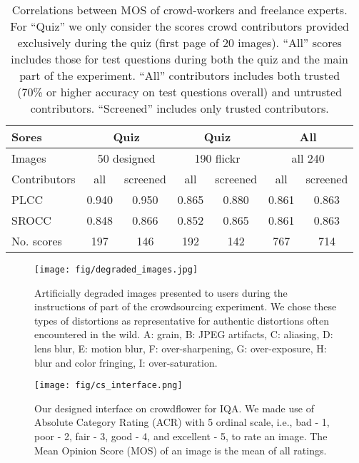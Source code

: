 \documentclass{article}
\begin{document}
\begin{table*}[!ht]
\centering
\caption{Correlations between MOS of crowd-workers and freelance experts. For ``Quiz'' we only consider the scores crowd contributors provided exclusively during the quiz (first page of 20 images). ``All'' scores includes  those for test questions during both the quiz and the main part of the experiment. ``All'' contributors includes both trusted (70\% or higher accuracy on test questions overall) and untrusted contributors. ``Screened'' includes only trusted contributors.}
\vspace{10pt}
\begin{tabular}{l |c c |c c| c c} \hline
Sores & \multicolumn{2}{c|}{Quiz}& 
	\multicolumn{2}{c|}{Quiz} & 
    \multicolumn{2}{c}{All}\\ \hline
Images & \multicolumn{2}{c|}{50 designed}& 
	\multicolumn{2}{c|}{190 flickr} & 
    \multicolumn{2}{c}{all 240}\\  \hline
Contributors & all & screened & all & screened & all & screened \\ \hline
PLCC & 0.940 & 0.950 & 0.865 & 0.880 & 0.861 & 0.863\\
SROCC & 0.848& 0.866& 0.852& 0.865& 0.861& 0.863\\
No. scores & 197& 146& 192& 142& 767& 714 \\ 
\hline
\end{tabular}
\label{table:quiz-questions}
\end{table*}








\begin{figure*}[!htb]
\centering
\texttt{[image: fig/degraded\_images.jpg]}
\caption{Artificially degraded images presented to users during the instructions of part of the crowdsourcing experiment. We chose these types of distortions as representative for authentic distortions often encountered in the wild. A: grain, B: JPEG artifacts, C: aliasing, D: lens blur, E: motion blur, F: over-sharpening, G: over-exposure, H: blur and color fringing, I: over-saturation.}
\label{fig:degraded_images}
\end{figure*}



\begin{figure*}[!htb]
\centering
\texttt{[image: fig/cs\_interface.png]}
\caption{Our designed interface on crowdflower for IQA. We made use of Absolute Category Rating (ACR) with 5 ordinal scale, i.e., bad - 1, poor - 2, fair - 3, good - 4, and excellent - 5, to rate an image. The Mean Opinion Score (MOS) of an image is the mean of all ratings.}
\label{fig:csinterface}
\end{figure*}
\end{document}
